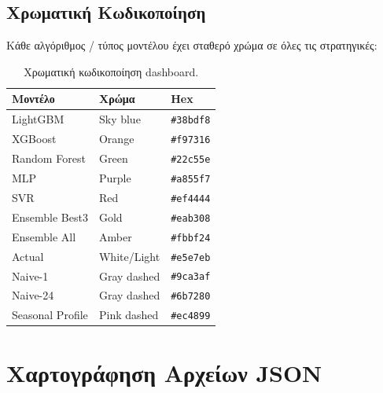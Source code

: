 \subsection*{Χρωματική Κωδικοποίηση}

Κάθε αλγόριθμος / τύπος μοντέλου έχει σταθερό χρώμα σε όλες τις
στρατηγικές:

\begin{table}[htbp]
\centering
\caption{Χρωματική κωδικοποίηση dashboard.}
\label{tab:dash_colors}
\begin{tabular}{lll}
\toprule
\textbf{Μοντέλο} & \textbf{Χρώμα} & \textbf{Hex} \\
\midrule
LightGBM         & Sky blue       & \texttt{\#38bdf8} \\
XGBoost          & Orange         & \texttt{\#f97316} \\
Random Forest    & Green          & \texttt{\#22c55e} \\
MLP              & Purple         & \texttt{\#a855f7} \\
SVR              & Red            & \texttt{\#ef4444} \\
Ensemble Best3   & Gold           & \texttt{\#eab308} \\
Ensemble All     & Amber          & \texttt{\#fbbf24} \\
Actual           & White/Light    & \texttt{\#e5e7eb} \\
Naive-1          & Gray dashed    & \texttt{\#9ca3af} \\
Naive-24         & Gray dashed    & \texttt{\#6b7280} \\
Seasonal Profile & Pink dashed    & \texttt{\#ec4899} \\
\bottomrule
\end{tabular}
\end{table}

\section{Χαρτογράφηση Αρχείων JSON}
\label{sec:dash_filemap}

